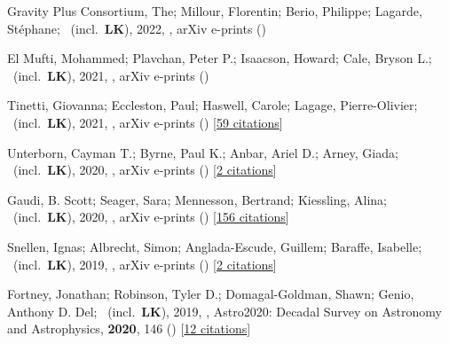 \item[{\color{numcolor}\scriptsize13}] Gravity Plus Consortium, The; Millour, Florentin; Berio, Philippe; Lagarde, St{\'e}phane; \etal\ (incl.\ \textbf{LK}), 2022, , arXiv e-prints ()

\item[{\color{numcolor}\scriptsize12}] El Mufti, Mohammed; Plavchan, Peter P.; Isaacson, Howard; Cale, Bryson L.; \etal\ (incl.\ \textbf{LK}), 2021, , arXiv e-prints ()

\item[{\color{numcolor}\scriptsize11}] Tinetti, Giovanna; Eccleston, Paul; Haswell, Carole; Lagage, Pierre-Olivier; \etal\ (incl.\ \textbf{LK}), 2021, , arXiv e-prints () [\href{https://ui.adsabs.harvard.edu/abs/2021arXiv210404824T}{59 citations}]

\item[{\color{numcolor}\scriptsize10}] Unterborn, Cayman T.; Byrne, Paul K.; Anbar, Ariel D.; Arney, Giada; \etal\ (incl.\ \textbf{LK}), 2020, , arXiv e-prints () [\href{https://ui.adsabs.harvard.edu/abs/2020arXiv200708665U}{2 citations}]

\item[{\color{numcolor}\scriptsize9}] Gaudi, B. Scott; Seager, Sara; Mennesson, Bertrand; Kiessling, Alina; \etal\ (incl.\ \textbf{LK}), 2020, , arXiv e-prints () [\href{https://ui.adsabs.harvard.edu/abs/2020arXiv200106683G}{156 citations}]

\item[{\color{numcolor}\scriptsize8}] Snellen, Ignas; Albrecht, Simon; Anglada-Escude, Guillem; Baraffe, Isabelle; \etal\ (incl.\ \textbf{LK}), 2019, , arXiv e-prints () [\href{https://ui.adsabs.harvard.edu/abs/2019arXiv190801803S}{2 citations}]

\item[{\color{numcolor}\scriptsize7}] Fortney, Jonathan; Robinson, Tyler D.; Domagal-Goldman, Shawn; Genio, Anthony D. Del; \etal\ (incl.\ \textbf{LK}), 2019, , Astro2020: Decadal Survey on Astronomy and Astrophysics, \textbf{2020}, 146 () [\href{https://ui.adsabs.harvard.edu/abs/2019astro2020T.146F}{12 citations}]

